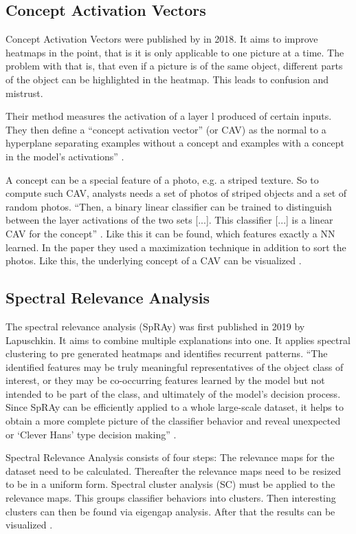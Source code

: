 \subsection{Concept Activation Vectors}
Concept Activation Vectors were published by  in 2018. It aims to improve heatmaps in the point, that is it is only applicable to one picture at a time. The problem with that is, that even if a picture is of the same object, different parts of the object can be highlighted in the heatmap. This leads to confusion and mistrust.
\par
Their method measures the activation of a layer l produced of certain inputs. They then define a “concept activation vector” (or CAV) as the normal to a hyperplane separating examples without a concept and examples with a concept in the model’s activations” \cite[3]{Kim.2018}.
\par
A concept can be a special feature of a photo, e.g. a striped texture. So to compute such CAV, analysts needs a set of photos of striped objects and a set of random photos.
“Then, a binary linear classifier can be trained to distinguish between the layer activations of the two sets 
[...].
This classifier 
[...]
is a linear CAV for the concept” \cite[3]{Kim.2018}. Like this it can be found, which features exactly a NN learned.
In the paper they used a maximization technique in addition to sort the photos. Like this, the  underlying concept of a CAV can be visualized \cite{Kim.2018}.

\subsection{Spectral Relevance Analysis}
The spectral relevance analysis (SpRAy) was first published in 2019 by Lapuschkin. It aims to combine multiple explanations into one. It applies spectral clustering to pre generated heatmaps and identifies recurrent patterns. “The identified features may be truly meaningful representatives of the object class of interest, or they may be co-occurring features learned by the model but not intended to be part of the class, and ultimately of the model’s decision process. Since SpRAy can be efficiently applied to a whole large-scale dataset, it helps to obtain a more complete picture of the classifier behavior and reveal unexpected or ‘Clever Hans’ type decision making” \cite[8]{Lapuschkin.2019}.
\par
Spectral Relevance Analysis consists of four steps:
The relevance maps for the dataset need to be calculated.
Thereafter the relevance maps need to be resized to be in a uniform form.
Spectral cluster analysis (SC) must be applied to the relevance maps. This groups classifier behaviors into clusters.
Then interesting clusters can then be found via eigengap analysis.
After that the results can be visualized \cite{Lapuschkin.2019}.
